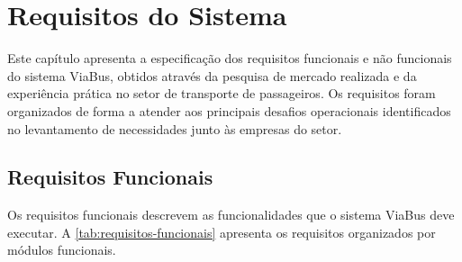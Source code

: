 \chapter{Requisitos do Sistema}

Este capítulo apresenta a especificação dos requisitos funcionais e não funcionais do sistema ViaBus, obtidos através da pesquisa de mercado realizada e da experiência prática no setor de transporte de passageiros. Os requisitos foram organizados de forma a atender aos principais desafios operacionais identificados no levantamento de necessidades junto às empresas do setor.
\section{Requisitos Funcionais}

Os requisitos funcionais descrevem as funcionalidades que o sistema ViaBus deve executar. A \autoref{tab:requisitos-funcionais} apresenta os requisitos organizados por módulos funcionais.

